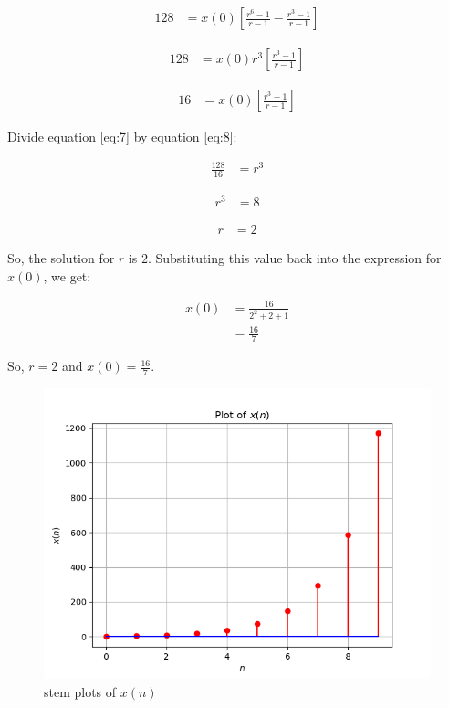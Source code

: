 \documentclass[journal,12pt,onecolumn]{IEEEtran}
\theoremstyle{remark}
\begin{document}
\begin{align}
128 &= x(0)\left[\frac{r^6 - 1}{r - 1} - \frac{r^3 - 1}{r - 1}\right] \label{eq:6}
\end{align}

\begin{align}
128 &= x(0)r^3\left[\frac{r^3 - 1}{r - 1}\right] \label{eq:7}
\end{align}

\begin{align}
16 &= x(0)\left[\frac{r^3 - 1}{r - 1}\right] \label{eq:8}
\end{align}

Divide equation \eqref{eq:7} by equation \eqref{eq:8}:

\begin{align}
\frac{128}{16} &= r^3 \label{eq:9}
\end{align}

\begin{align}
r^3 &= 8 \label{eq:10}
\end{align}

\begin{align}
r &= 2 \label{eq:11}
\end{align}

So, the solution for $r$ is $2$. Substituting this value back into the expression for $x(0)$, we get:

\begin{align}
x(0) &= \frac{16}{2^2 + 2 + 1} \label{eq:12} \\
&= \frac{16}{7} \label{eq:13}
\end{align}

So, $r = 2$ and $x(0) = \frac{16}{7}$.
\begin{figure}[h!]
    \centering
    \includegraphics[width=\columnwidth]{figs/plotx.png}
    \caption{stem plots of $x(n)$}
    \label{fig:1}
\end{figure}
\end{document}
